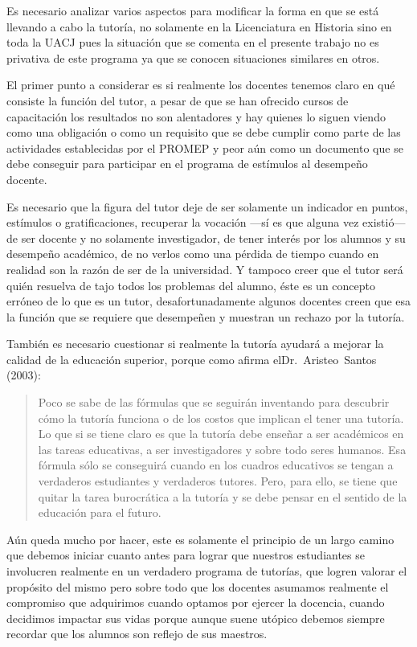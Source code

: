 Es necesario analizar varios aspectos para modificar la forma en que se está
llevando a cabo la tutoría, no solamente en la Licenciatura en Historia
sino en toda la UACJ pues la situación que se comenta en el presente
trabajo no es privativa de este programa ya que se conocen situaciones
similares en otros.


El primer punto a considerar es si realmente los docentes tenemos claro en
qué consiste la función del tutor, a pesar de que se han ofrecido cursos de
capacitación los resultados no son alentadores y hay quienes lo siguen
viendo como una obligación o como un requisito que se debe cumplir como
parte de las actividades establecidas por el PROMEP y peor aún como un
documento que se debe conseguir para participar en el programa de estímulos
al desempeño docente. 


Es necesario que la figura del tutor deje de ser solamente un indicador en
puntos, estímulos o gratificaciones, recuperar la vocación ---sí es que
alguna vez existió--- de ser docente y no solamente investigador, de tener
interés por los alumnos y su desempeño académico, de no verlos como una
pérdida de tiempo cuando en realidad son la razón de ser de la universidad.
Y tampoco creer que el tutor será quién resuelva de tajo todos los
problemas del alumno, éste es un concepto erróneo de lo que es un tutor,
desafortunadamente algunos docentes creen que esa la función que se
requiere que desempeñen y muestran un rechazo por la tutoría.
\newpage

También es necesario cuestionar si realmente la tutoría ayudará a mejorar la
calidad de la educación superior, porque como afirma 
el\linebreak Dr.~Aristeo~Santos (2003):

\begin{quotation}
Poco se sabe de las fórmulas que se seguirán inventando para descubrir cómo
la tutoría funciona o de los costos que implican el tener una tutoría. Lo
que si se tiene claro es que la tutoría debe enseñar a ser académicos en
las tareas educativas, a ser investigadores y sobre todo seres humanos. Esa
fórmula sólo se conseguirá cuando en los cuadros educativos se tengan a
verdaderos estudiantes y verdaderos tutores. Pero, para ello, se tiene que
quitar la tarea burocrática a la tutoría y se debe pensar en el sentido de
la educación para el futuro.
\end{quotation}

Aún queda mucho por hacer, este es solamente el principio de un largo camino
que debemos iniciar cuanto antes para lograr que nuestros estudiantes se
involucren realmente en un verdadero programa de tutorías, que logren
valorar el propósito del mismo pero sobre todo que los docentes asumamos
realmente el compromiso que adquirimos cuando optamos por  ejercer la
docencia, cuando decidimos impactar sus vidas porque aunque suene utópico
debemos siempre recordar que los alumnos son reflejo de sus maestros.
\newpage

